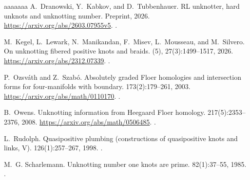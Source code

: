 \documentclass[a4paper,11pt]{amsart}
\numberwithin{equation}{subsection}
\theoremstyle{plain}
\theoremstyle{remark}
\begin{document}
\begin{thebibliography}{aaaaaaa}
A.~Dranowski, Y.~Kabkov, and D.~Tubbenhauer.
\newblock RL unknotter, hard unknots and unknotting number.
\newblock Preprint, 2026.
\newblock \url{https://arxiv.org/abs/2603.07955v5}.
\newblock \href{https://doi.org/10.48550/arXiv.2603.07955}{}.

M.~Kegel, L.~Lewark, N.~Manikandan, F.~Misev, L.~Mousseau, and M.~Silvero.
\newblock On unknotting fibered positive knots and braids.
 (5), 27(3):1499--1517, 2026.
\newblock \url{https://arxiv.org/abs/2312.07339}.
\newblock \href{https://doi.org/10.2422/2036-2145.202401_001}{}.

P.~Ozsv\'ath and Z.~Szab\'o.
\newblock Absolutely graded Floer homologies and intersection forms for four-manifolds with boundary.
 173(2):179--261, 2003.
\newblock \url{https://arxiv.org/abs/math/0110170}.
\newblock \href{https://doi.org/10.1016/S0001-8708(02)00030-0}{}.

B.~Owens.
\newblock Unknotting information from Heegaard Floer homology.
 217(5):2353--2376, 2008.
\newblock \url{https://arxiv.org/abs/math/0506485}.
\newblock \href{https://doi.org/10.1016/j.aim.2007.10.006}{}.

L.~Rudolph.
\newblock Quasipositive plumbing (constructions of quasipositive knots and links, V).
 126(1):257--267, 1998.
\newblock \href{https://doi.org/10.1090/S0002-9939-98-04407-4}{}.

M.~G. Scharlemann.
\newblock Unknotting number one knots are prime.
 82(1):37--55, 1985.
\newblock \href{https://doi.org/10.1007/BF01394778}{}.

\end{thebibliography}
\end{document}

